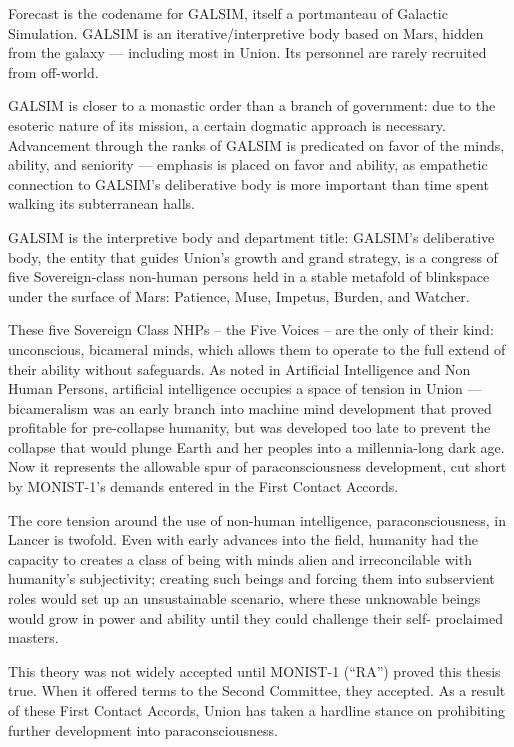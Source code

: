 Forecast is the codename for GALSIM, itself a portmanteau of Galactic Simulation. GALSIM is an
iterative/interpretive body based on Mars, hidden from the galaxy — including most in Union. Its
personnel are rarely recruited from off-world.


GALSIM is closer to a monastic order than a branch of government: due to the esoteric nature of
its mission, a certain dogmatic approach is necessary. Advancement through the ranks of
GALSIM is predicated on favor of the minds, ability, and seniority — emphasis is placed on favor
and ability, as empathetic connection to GALSIM’s deliberative body is more important than time
spent walking its subterranean halls.


GALSIM is the interpretive body and department title: GALSIM’s deliberative body, the entity that
guides Union’s growth and grand strategy, is a congress of five Sovereign-class non-human
persons held in a stable metafold of blinkspace under the surface of Mars: Patience, Muse,
Impetus, Burden, and Watcher.


These five Sovereign Class NHPs -- the Five Voices -- are the only of their kind: unconscious,
bicameral minds, which allows them to operate to the full extend of their ability without
safeguards. As noted in Artificial Intelligence and Non Human Persons, artificial intelligence
occupies a space of tension in Union — bicameralism was an early branch into machine mind
development that proved profitable for pre-collapse humanity, but was developed too late to
prevent the collapse that would plunge Earth and her peoples into a millennia-long dark age.
Now it represents the allowable spur of paraconsciousness development, cut short by
MONIST-1’s demands entered in the First Contact Accords.





The core tension around the use of non-human intelligence, paraconsciousness, in Lancer is
twofold. Even with early advances into the field, humanity had the capacity to creates a class of
being with minds alien and irreconcilable with humanity’s subjectivity; creating such beings and
forcing them into subservient roles would set up an unsustainable scenario, where these
unknowable beings would grow in power and ability until they could challenge their self-
proclaimed masters.


This theory was not widely accepted until MONIST-1 (“RA”) proved this thesis true. When it
offered terms to the Second Committee, they accepted. As a result of these First Contact
Accords, Union has taken a hardline stance on prohibiting further development into
paraconsciousness.


